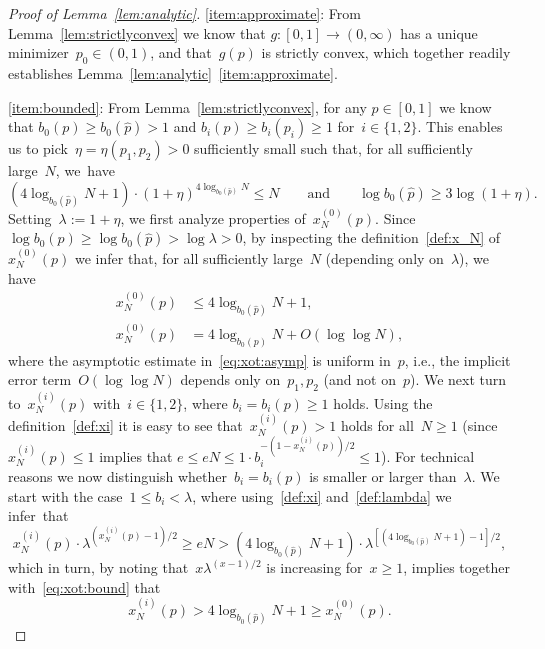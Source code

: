 \documentclass{article}
\newcommand{\xot}{x^{(0)}}
\newcommand{\ps}{\hat{p}}
\begin{document}
\begin{proof}[Proof of Lemma~\ref{lem:analytic}]
\ref{item:approximate}: 
From Lemma~\ref{lem:strictlyconvex} we know that $g:[0,1] \to (0,\infty)$ has a unique minimizer~$p_0 \in (0,1)$, 
and that~$g(p)$ is strictly convex, which together readily establishes Lemma~\ref{lem:analytic}~\ref{item:approximate}. 

\ref{item:bounded}: 
From Lemma~\ref{lem:strictlyconvex}, for any $p\in [0,1]$ we know that $b_0(p)\ge b_0(\ps)>1$ and $b_i(p)\ge b_i(p_i)\ge 1$ for~$i \in \{1,2\}$. 
This enables us to pick~$\eta=\eta(p_1,p_2)>0$ sufficiently small such that, for all sufficiently large~$N$, we~have
\begin{equation} \label{def:lambda}
(4\log_{b_0(\ps)}N+1) \cdot  (1+\eta)^{4\log_{b_0(\ps)}N} \le N \qquad \text{and} \qquad \log b_0(\ps) \ge 3\log (1+\eta).
\end{equation}
Setting~$\lambda := 1+\eta$, we first analyze properties of~$\xot_N(p)$. 
Since~$\log b_0(p) \ge \log b_0(\ps) >  \log \lambda > 0$, 
by inspecting the definition~\eqref{def:x_N} of $\xot_N(p)$ we infer that, for all sufficiently large~$N$ (depending only on~$\lambda$), we have
\begin{align} \label{eq:xot:bound}
\xot_N(p) & \le 4\log_{b_0(\ps)}N+1,\\
\label{eq:xot:asymp}
\xot_N(p) & = 4\log_{b_0(p)} N + O(\log \log N) , 
\end{align} 
where the asymptotic estimate in~\eqref{eq:xot:asymp} is uniform in~$p$, i.e., the implicit error term~$O(\log \log N)$ depends only on~$p_1,p_2$ (and not on~$p$). 
We next turn to~$x^{(i)}_N(p)$ with~$i\in \{1,2\}$, 
where ${b_i=b_i(p) \ge 1}$ holds.
Using the definition~\eqref{def:xi} it is easy to see that~$x^{(i)}_N(p) > 1$ holds for all~$N \ge 1$ (since~$x^{(i)}_N(p) \le 1$ implies that $e \le eN \le 1 \cdot b_i^{-(1-x^{(i)}_N(p))/2} \le 1$).
For technical reasons we now distinguish whether~${b_i=b_i(p)}$ is smaller or larger than~$\lambda$. 
We start with the case~${1 \le b_i < \lambda}$, 
where using~\eqref{def:xi} and~\eqref{def:lambda} we infer~that
\[ 
x^{(i)}_N(p) \cdot \lambda ^{(x^{(i)}_N(p)-1)/2} 
\ge 
eN>(4\log_{b_0(\ps)}N+1) \cdot  \lambda^{[(4\log_{b_0(\ps)}N+1)-1]/2} ,\]
which in turn, by noting that~$x\lambda^{(x-1)/2}$ is increasing for~$x \ge 1$, implies together with~\eqref{eq:xot:bound} that
\begin{equation} \label{eq:xiot:comparison}
x^{(i)}_N(p)> 4\log_{b_0(\ps)}N+1 \ge x^{(0)}_N(p) .
\end{equation}

\end{proof}
\end{document}
